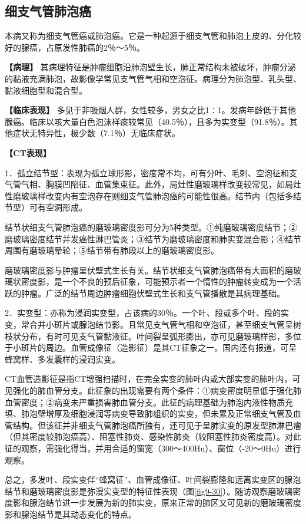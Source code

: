 \subsection{细支气管肺泡癌}

本病又称为细支气管癌或肺泡癌。它是一种起源于细支气管和肺泡上皮的、分化较好的腺癌，占原发性肺癌的2％～5％。

\textbf{【病理】}
其病理特征是肿瘤细胞沿肺泡壁生长，肺正常结构未被破坏，肿瘤分泌的黏液充满肺泡，故影像学常见支气管气相和空泡征。病理分为肺泡型、乳头型、黏液细胞型和混合型。

\textbf{【临床表现】}
多见于非吸烟人群，女性较多，男女之比1∶1。发病年龄低于其他腺癌。临床以咳大量白色泡沫样痰较常见（40.5％），且多为实变型（91.8％）。其他症状无特异性，极少数（7.1％）无临床症状。

\textbf{【CT表现】}

1．孤立结节型：表现为孤立球形影，密度常不均，可有分叶、毛刺、空泡征和支气管气相、胸膜凹陷征、血管集束征。此外，局灶性磨玻璃样改变较常见，如局灶性磨玻璃样改变内有空泡存在则细支气管肺泡癌的可能性很高。结节内（包括多结节型）可有空洞形成。

结节状细支气管肺泡癌的磨玻璃密度影可分为5种类型。①纯磨玻璃密度结节；②磨玻璃密度结节并发癌性淋巴管炎；③结节为磨玻璃密度和肺实变混合影；④结节周围有磨玻璃晕轮；⑤结节带有肺段以上的磨玻璃密度影。

磨玻璃密度影与肿瘤呈伏壁式生长有关。结节状细支气管肺泡癌带有大面积的磨玻璃状密度影，是一个不良的预后征象，可能预示者一个惰性的肿瘤转变成为一个活跃的肿瘤。广泛的结节周边肿瘤细胞伏壁式生长和支气管播散是其病理基础。

2．实变型：亦称为浸润实变型，占该病的30％。一个叶、段或多个叶、段的实变，常合并小斑片或腺泡结节影。且常见支气管气相和空泡征，甚至细支气管呈树枝状分布，有时可见支气管黏液征。叶间裂呈弧形膨出，亦可见磨玻璃样影，多位于小斑片的周边。血管成像征（造影征）是其CT征象之一。国内还有报道，可呈蜂窝样、多发囊样的浸润实变。

CT血管造影征是指CT增强扫描时，在完全实变的肺叶内或大部实变的肺叶内，可见强化的肺血管分支。此征象的出现需要有两个条件：①病变密度明显低于强化肺血管密度；②病变未严重损害肺血管分支。此征的病理基础为肺泡内液性物质充填、肺泡壁增厚及细胞浸润等病变导致肺组织的实变，但未累及正常细支气管及血管结构。但该征并非细支气管肺泡癌所独有，还可见于呈肺实变的原发型肺淋巴瘤（但其密度较肺泡癌高）、阻塞性肺炎、感染性肺炎（较阻塞性肺炎密度高）。对此征的观察，需强化得当，并用合适的窗宽（300～400Hu）、窗位（-20～0Hu）进行观察。

总之，多发叶、段实变伴“蜂窝征”、血管成像征、叶间裂膨隆和远离实变区的腺泡结节和磨玻璃密度影是弥漫实变型的特征性表现（图\ref{fig9-30}）。随访观察磨玻璃密度影和腺泡结节进一步发展为新的肺实变，原来正常的肺区又可见新的磨玻璃密度影和腺泡结节是其动态变化的特点。



